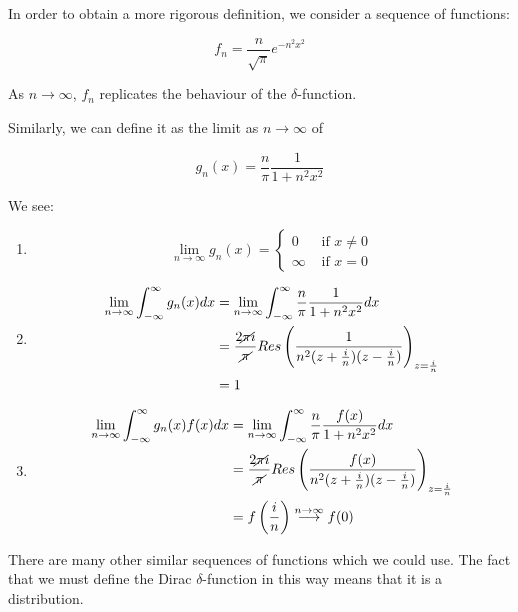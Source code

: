 \documentclass{../../physics_notes}
\begin{document}
In order to obtain a more rigorous definition, we consider a sequence of functions:

\begin{equation*}
f_n = \frac{n}{\sqrt{\pi}}e^{-n^2x^2}
\end{equation*}

As $n\to\infty$, $f_n$ replicates the behaviour of the $\delta$-function.

Similarly, we can define it as the limit as $n\to\infty$ of

\begin{equation*}
g_n(x) = \frac{n}{\pi}\frac{1}{1+n^2x^2}
\end{equation*}

We see:

\begin{enumerate}
	\item{\[\lim_{n\to\infty}g_n(x) = \begin{cases} 0 & \text{ if } x\neq0 \\ \infty & \text{ if } x=0\end{cases}\]}
	\item{
	\begin{align*} \lim_{n\to\infty}\int_{-\infty}^\infty g_n(x)dx &= \lim_{n\to\infty}\int_{-\infty}^\infty \frac{n}{\pi}\frac{1}{1+n^2x^2}dx \\
	&= \frac{2\cancel{\pi} i}{\cancel{\pi}}Res\left(\frac{1}{n^2(z+\frac{i}{n})(z-\frac{i}{n})}\right)_{z=\frac{i}{n}} \\
	&= 1
	\end{align*}}
	\item{
	\begin{align*} \lim_{n\to\infty}\int_{-\infty}^\infty g_n(x)f(x)dx &= \lim_{n\to\infty}\int_{-\infty}^\infty \frac{n}{\pi}\frac{f(x)}{1+n^2x^2}dx \\
	&= \frac{2\cancel{\pi} i}{\cancel{\pi}}Res\left(\frac{f(x)}{n^2(z+\frac{i}{n})(z-\frac{i}{n})}\right)_{z=\frac{i}{n}} \\
	&= f\left(\frac{i}{n}\right) \stackrel{n\to\infty}{\longrightarrow} f(0)
	\end{align*}}
\end{enumerate}

There are many other similar sequences of functions which we could use. The fact that we must define the Dirac $\delta$-function in this way means that it is a distribution.
\end{document}
